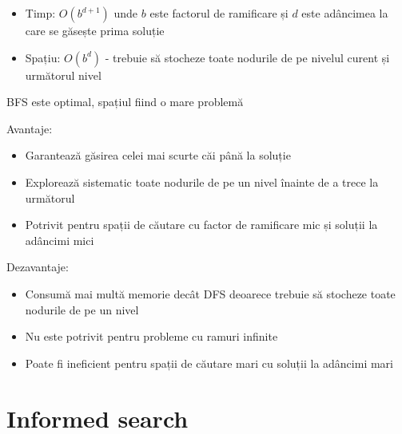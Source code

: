 \begin{itemize}
    \item Timp: $O(b^{d+1})$ unde $b$ este factorul de ramificare și $d$ este adâncimea la care se găsește prima soluție
    \item Spațiu: $O(b^d)$ - trebuie să stocheze toate nodurile de pe nivelul curent și următorul nivel
\end{itemize}
\par BFS este optimal, spațiul fiind o mare problemă
\par Avantaje:
\begin{itemize}
	\item Garantează găsirea celei mai scurte căi până la soluție
	\item Explorează sistematic toate nodurile de pe un nivel înainte de a trece la următorul
	\item Potrivit pentru spații de căutare cu factor de ramificare mic și soluții la adâncimi mici
\end{itemize}

\par Dezavantaje:
\begin{itemize}
	\item Consumă mai multă memorie decât DFS deoarece trebuie să stocheze toate nodurile de pe un nivel
	\item Nu este potrivit pentru probleme cu ramuri infinite
	\item Poate fi ineficient pentru spații de căutare mari cu soluții la adâncimi mari
\end{itemize}

\pagebreak

\section{Informed search}
